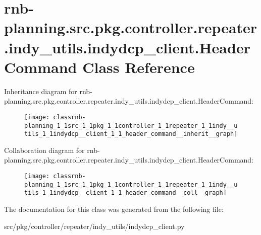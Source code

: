 \hypertarget{classrnb-planning_1_1src_1_1pkg_1_1controller_1_1repeater_1_1indy__utils_1_1indydcp__client_1_1_header_command}{}\section{rnb-\/planning.src.\+pkg.\+controller.\+repeater.\+indy\+\_\+utils.\+indydcp\+\_\+client.\+Header\+Command Class Reference}
\label{classrnb-planning_1_1src_1_1pkg_1_1controller_1_1repeater_1_1indy__utils_1_1indydcp__client_1_1_header_command}


Inheritance diagram for rnb-\/planning.src.\+pkg.\+controller.\+repeater.\+indy\+\_\+utils.\+indydcp\+\_\+client.\+Header\+Command\+:\nopagebreak
\begin{figure}[H]
\begin{center}
\leavevmode
\texttt{[image: classrnb-planning\_1\_1src\_1\_1pkg\_1\_1controller\_1\_1repeater\_1\_1indy\_\_utils\_1\_1indydcp\_\_client\_1\_1\_header\_command\_\_inherit\_\_graph]}
\end{center}
\end{figure}


Collaboration diagram for rnb-\/planning.src.\+pkg.\+controller.\+repeater.\+indy\+\_\+utils.\+indydcp\+\_\+client.\+Header\+Command\+:\nopagebreak
\begin{figure}[H]
\begin{center}
\leavevmode
\texttt{[image: classrnb-planning\_1\_1src\_1\_1pkg\_1\_1controller\_1\_1repeater\_1\_1indy\_\_utils\_1\_1indydcp\_\_client\_1\_1\_header\_command\_\_coll\_\_graph]}
\end{center}
\end{figure}


The documentation for this class was generated from the following file\+:\begin{DoxyCompactItemize}
\item 
src/pkg/controller/repeater/indy\+\_\+utils/indydcp\+\_\+client.\+py\end{DoxyCompactItemize}
